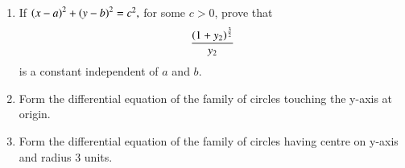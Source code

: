\begin{enumerate}[label=\arabic*.,ref=\thesubsection.\theenumi]
%
\item If 
$
\left(x-a\right)^2+\left(y-b\right)^2 = c^2,
$
for some $c > 0$, prove that 
\begin{align}
\frac{\left(1+y_2\right)^\frac{3}{2}}{y_2}
\end{align}
%
is a constant independent of $a$ and $b$.
%
\item Form the differential equation of the family of circles touching the y-axis at origin.
\item Form the differential equation of the family of circles having centre on y-axis and radius 3 units.
\end{enumerate}
